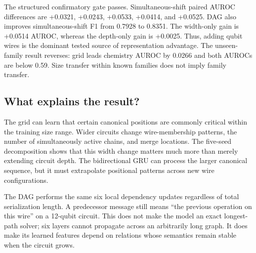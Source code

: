 \documentclass[10pt,twocolumn]{article}
\begin{document}
\begin{table}[t]
\centering
\caption{Structured final AUROC (five-seed mean $\pm$ sample standard deviation).}
\label{tab:structured}
\end{table}

The structured confirmatory gate passes. Simultaneous-shift paired AUROC differences are +0.0321, +0.0243, +0.0533, +0.0414, and +0.0525. DAG also improves simultaneous-shift F1 from 0.7928 to 0.8351. The width-only gain is +0.0514 AUROC, whereas the depth-only gain is +0.0025. Thus, adding qubit wires is the dominant tested source of representation advantage. The unseen-family result reverses: grid leads chemistry AUROC by 0.0266 and both AUROCs are below 0.59. Size transfer within known families does not imply family transfer.

\subsection{What explains the result?}

The grid can learn that certain canonical positions are commonly critical within the training size range. Wider circuits change wire-membership patterns, the number of simultaneously active chains, and merge locations. The five-seed decomposition shows that this width change matters much more than merely extending circuit depth. The bidirectional GRU can process the larger canonical sequence, but it must extrapolate positional patterns across new wire configurations.

The DAG performs the same six local dependency updates regardless of total serialization length. A predecessor message still means ``the previous operation on this wire'' on a 12-qubit circuit. This does not make the model an exact longest-path solver; six layers cannot propagate across an arbitrarily long graph. It does make its learned features depend on relations whose semantics remain stable when the circuit grows.
\end{document}
